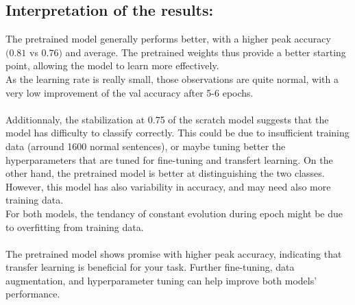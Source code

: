 \documentclass[a4paper]{article}
\begin{document}
    \subsection*{Interpretation of the results:} 
        The pretrained model generally performs better, with a higher peak accuracy $(0.81$ vs $0.76)$
        and average. The pretrained weights thus provide a better starting point, allowing the model
        to learn more effectively.
        \\
        As the learning rate is really small, those observations are quite normal, with
        a very low improvement of the val accuracy after 5-6 epochs.
        \\
        \\
        Additionnaly, the stabilization at 0.75 of the scratch model suggests that the model has
        difficulty to classify correctly. This could be due to insufficient training data
        (arround 1600 normal sentences), or maybe tuning better the hyperparameters that are
        tuned for fine-tuning and transfert learning. On the other hand,
        the pretrained model is better at distinguishing the two classes. However,
        this model has also variability in accuracy, and may need also more training data.
        \\
        For both models, the tendancy of constant evolution during epoch might be due
        to overfitting from training data.
        \\
        \\
        The pretrained model shows promise with higher peak accuracy, indicating that
        transfer learning is beneficial for your task. Further fine-tuning, data
        augmentation, and hyperparameter tuning can help improve both models' performance.
\end{document}
